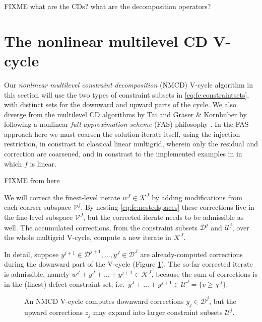 \documentclass[letterpaper,final,12pt,reqno]{amsart}
\theoremstyle{cstyle}
\theoremstyle{cstyle*}
\theoremstyle{dstyle}
\numberwithin{equation}{section}
\numberwithin{figure}{section}
\numberwithin{table}{section}
\numberwithin{theorem}{section}
\begin{document}
FIXME what are the CDs?  what are the decomposition operators?


\section{The nonlinear multilevel CD V-cycle} \label{sec:vcycle}

Our \emph{nonlinear multilevel constraint decomposition} (NMCD) V-cycle algorithm in this section will use the two types of constraint subsets in \eqref{eq:fe:constraintsets}, with distinct sets for the downward and upward parts of the cycle.  We also diverge from the multilevel CD algorithms by Tai \cite{Tai2003} and Gr\"aser \& Kornhuber \cite[Algorithm 4.7]{GraeserKornhuber2009} by following a nonlinear \emph{full approximation scheme} (FAS) philosophy \cite{BrandtLivne2011}.  In the FAS approach here we must coarsen the solution iterate itself, using the injection restriction, in constrast to classical linear multigrid, wherein only the residual and correction are coarsened, and in constrast to the implemented examples in \cite{GraeserKornhuber2009,Tai2003} in which $f$ is linear.

FIXME from here

We will correct the finest-level iterate $w^J\in \mathcal{K}^J$ by adding modifications from each coarser subspace $\mathcal{V}^j$.  By nesting \eqref{eq:fe:nestedspaces} these corrections live in the fine-level subspace $\mathcal{V}^J$, but the corrected iterate needs to be admissible as well.  The accumulated corrections, from the constraint subsets $\mathcal{D}^j$ and $\mathcal{U}^j$, over the whole multigrid V-cycle, compute a new iterate in $\mathcal{K}^J$.

In detail, suppose $y^{j+1} \in \mathcal{D}^{j+1}, \dots, y^J \in \mathcal{D}^J$ are already-computed corrections during the downward part of the V-cycle (Figure \ref{fig:nmcdvcycle}).  The so-far corrected iterate is admissible, namely $w^J + y^J + \dots + y^{j+1} \in \mathcal{K}^J$, because the sum of corrections is in the (finest) defect constraint set, i.e.~$y^J + \dots + y^{j+1} \in \mathcal{U}^J = \{v\ge \chi^J\}$.

\begin{figure}[ht]
\begin{center}

\end{center}
\caption{An NMCD V-cycle computes downward corrections $y_j \in \mathcal{D}^j$, but the upward corrections $z_j$ may expand into larger constraint subsets $\mathcal{U}^j$.}
\label{fig:nmcdvcycle}
\end{figure}
\end{document}
